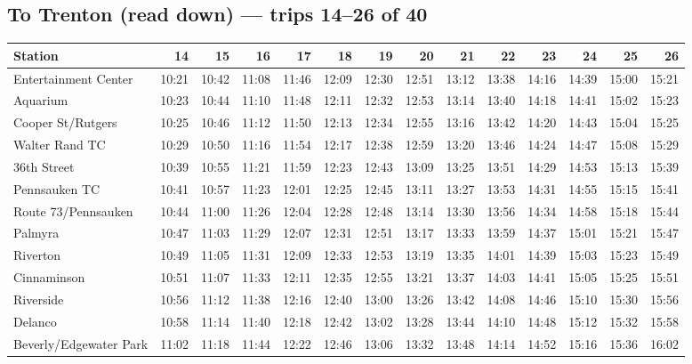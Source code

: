 \subsection*{To Trenton (read down) --- trips 14--26 of 40}
\begin{center}\footnotesize\setlength{\tabcolsep}{3pt}\begin{tabular}{@{}lrrrrrrrrrrrrr@{}}\toprule
Station & 14 & 15 & 16 & 17 & 18 & 19 & 20 & 21 & 22 & 23 & 24 & 25 & 26 \\\midrule
Entertainment Center & 10:21 & 10:42 & 11:08 & 11:46 & 12:09 & 12:30 & 12:51 & 13:12 & 13:38 & 14:16 & 14:39 & 15:00 & 15:21 \\
Aquarium & 10:23 & 10:44 & 11:10 & 11:48 & 12:11 & 12:32 & 12:53 & 13:14 & 13:40 & 14:18 & 14:41 & 15:02 & 15:23 \\
Cooper St/Rutgers & 10:25 & 10:46 & 11:12 & 11:50 & 12:13 & 12:34 & 12:55 & 13:16 & 13:42 & 14:20 & 14:43 & 15:04 & 15:25 \\
Walter Rand TC & 10:29 & 10:50 & 11:16 & 11:54 & 12:17 & 12:38 & 12:59 & 13:20 & 13:46 & 14:24 & 14:47 & 15:08 & 15:29 \\
36th Street & 10:39 & 10:55 & 11:21 & 11:59 & 12:23 & 12:43 & 13:09 & 13:25 & 13:51 & 14:29 & 14:53 & 15:13 & 15:39 \\
Pennsauken TC & 10:41 & 10:57 & 11:23 & 12:01 & 12:25 & 12:45 & 13:11 & 13:27 & 13:53 & 14:31 & 14:55 & 15:15 & 15:41 \\
Route 73/Pennsauken & 10:44 & 11:00 & 11:26 & 12:04 & 12:28 & 12:48 & 13:14 & 13:30 & 13:56 & 14:34 & 14:58 & 15:18 & 15:44 \\
Palmyra & 10:47 & 11:03 & 11:29 & 12:07 & 12:31 & 12:51 & 13:17 & 13:33 & 13:59 & 14:37 & 15:01 & 15:21 & 15:47 \\
Riverton & 10:49 & 11:05 & 11:31 & 12:09 & 12:33 & 12:53 & 13:19 & 13:35 & 14:01 & 14:39 & 15:03 & 15:23 & 15:49 \\
Cinnaminson & 10:51 & 11:07 & 11:33 & 12:11 & 12:35 & 12:55 & 13:21 & 13:37 & 14:03 & 14:41 & 15:05 & 15:25 & 15:51 \\
Riverside & 10:56 & 11:12 & 11:38 & 12:16 & 12:40 & 13:00 & 13:26 & 13:42 & 14:08 & 14:46 & 15:10 & 15:30 & 15:56 \\
Delanco & 10:58 & 11:14 & 11:40 & 12:18 & 12:42 & 13:02 & 13:28 & 13:44 & 14:10 & 14:48 & 15:12 & 15:32 & 15:58 \\
Beverly/Edgewater Park & 11:02 & 11:18 & 11:44 & 12:22 & 12:46 & 13:06 & 13:32 & 13:48 & 14:14 & 14:52 & 15:16 & 15:36 & 16:02 \\

\end{tabular}
\end{center}
